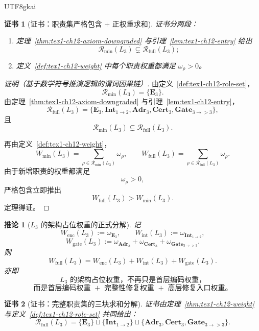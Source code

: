 \documentclass[12pt]{article}
\newtheorem{corollary}{推论}[section]
\newtheorem{Certificate}{证书}[section]
\begin{document}
\begin{CJK*}{UTF8}{gkai}
\begin{Certificate}[证书：职责集严格包含 + 正权重求和]
\label{cert:tex1-ch12-weight}
证书分两段：
\begin{enumerate}
  \item 定理~\ref{thm:tex1-ch12-axiom-downgraded} 与引理~\ref{lem:tex1-ch12-entry} 给出
  \[
    \mathcal R_{\mathrm{min}}(L_3)\subsetneq \mathcal R_{\mathrm{full}}(L_3);
  \]
  \item 定义~\ref{def:tex1-ch12-weight} 中每个职责权重都满足 \(\omega_\rho>0\)。
\end{enumerate}
\end{Certificate}

\begin{proof}[证明（基于数学符号推演逻辑的谓词因果链）]
由定义~\ref{def:tex1-ch12-role-set}，
\[
  \mathcal R_{\mathrm{min}}(L_3)=\{\mathbf E_3\}.
\]
由定理~\ref{thm:tex1-ch12-axiom-downgraded} 与引理~\ref{lem:tex1-ch12-entry}，
\[
  \mathcal R_{\mathrm{full}}(L_3)
  =
  \{\mathbf E_3,\mathbf{Int}_{1\to2},\mathbf{Adr}_3,\mathbf{Cert}_3,\mathbf{Gate}_{3\to >3}\},
\]
且
\[
  \mathcal R_{\mathrm{min}}(L_3)\subsetneq \mathcal R_{\mathrm{full}}(L_3).
\]

再由定义~\ref{def:tex1-ch12-weight}，
\[
  W_{\mathrm{min}}(L_3)
  =
  \sum_{\rho\in\mathcal R_{\mathrm{min}}(L_3)}\omega_\rho,
  \qquad
  W_{\mathrm{full}}(L_3)
  =
  \sum_{\rho\in\mathcal R_{\mathrm{full}}(L_3)}\omega_\rho.
\]
由于新增职责的权重都满足
\[
  \omega_\rho>0,
\]
严格包含立即推出
\[
  W_{\mathrm{full}}(L_3)>W_{\mathrm{min}}(L_3).
\]
定理得证。
\end{proof}

\begin{corollary}[\(L_3\) 的架构占位权重的正式分解]
\label{cor:tex1-ch12-weight-decompose}
记
\[
  W_{\mathrm{enc}}(L_3):=\omega_{\mathbf E_3},
  \qquad
  W_{\mathrm{int}}(L_3):=\omega_{\mathbf{Int}_{1\to2}},
\]
\[
  W_{\mathrm{gate}}(L_3)
  :=
  \omega_{\mathbf{Adr}_3}
  +
  \omega_{\mathbf{Cert}_3}
  +
  \omega_{\mathbf{Gate}_{3\to >3}}.
\]
则
\[
  \boxed{
    W_{\mathrm{full}}(L_3)
    =
    W_{\mathrm{enc}}(L_3)
    +
    W_{\mathrm{int}}(L_3)
    +
    W_{\mathrm{gate}}(L_3).
  }
\]
亦即
\[
  \boxed{
    L_3\text{ 的架构占位权重，不再只是首层编码权重，}
  }
\]
\[
  \boxed{
    \text{而是首层编码权重 }+\text{ 完整性修复权重 }+\text{ 高层修复入口权重。}
  }
\]
\end{corollary}

\begin{Certificate}[证书：完整职责集的三块求和分解]
\label{cert:tex1-ch12-weight-decompose}
证书由定理~\ref{thm:tex1-ch12-weight} 与定义~\ref{def:tex1-ch12-role-set} 共同给出：
\[
  \mathcal R_{\mathrm{full}}(L_3)
  =
  \{\mathbf E_3\}
  \sqcup
  \{\mathbf{Int}_{1\to2}\}
  \sqcup
  \{\mathbf{Adr}_3,\mathbf{Cert}_3,\mathbf{Gate}_{3\to >3}\}.
\]
\end{Certificate}


\end{CJK*}
\end{document}
